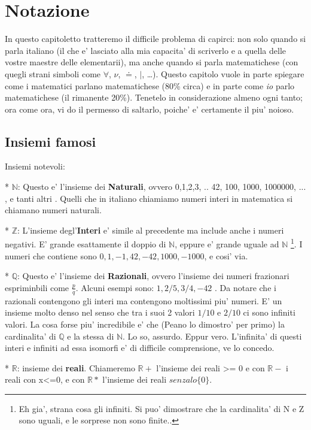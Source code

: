 \label{notazione}
\chapter{Notazione}

In questo capitoletto tratteremo il difficile problema di capirci: non solo quando si parla italiano (il che e' lasciato
alla mia capacita' di scriverlo e a quella delle vostre maestre delle elementarii), ma anche quando si parla matematichese
(con quegli strani simboli come $\forall$, $\nu$, $\doteq$, $|$, \ldots). Questo capitolo vuole in parte spiegare come i
matematici parlano matematichese (80\% circa) e in parte come {\em io} parlo matematichese (il rimanente 20\%).
Tenetelo in considerazione almeno ogni tanto; ora come ora, vi do il permesso di saltarlo, poiche' e' certamente il piu' noioso.

\section{Insiemi famosi}

Insiemi notevoli:

* $\mathbb{N}$: Questo e' l'insieme dei \textbf{Naturali}, ovvero {0,1,2,3, .. 42, 100, 1000, 1000000, ... , e tanti altri }. Quelli che in
  italiano chiamiamo numeri interi in matematica si chiamano numeri naturali.

* $\mathbb{Z}$: L'insieme degl'\textbf{Interi} e' simile al precedente ma include anche i numeri negativi. 
 E' grande esattamente il doppio di $\mathbb{N}$, eppure e' grande uguale ad $\mathbb{N}$ \footnote{Eh gia', strana cosa gli infiniti. Si puo' dimostrare che la cardinalita' di N e Z sono uguali, e le sorprese non sono finite.. }.
 I numeri che contiene sono $0,1,-1,42,-42,1000,-1000$, e cosi' via.

* $\mathbb{Q}$: Questo e' l'insieme dei \textbf{Razionali}, ovvero l'insieme dei numeri frazionari espriminbili come $\frac{p}{q}$.
Alcuni esempi sono: $1,2/5,3/4,-42$ . Da notare che i razionali contengono gli interi ma contengono moltissimi piu' numeri.
E' un insieme molto denso nel senso
che tra i suoi 2 valori $1/10$ e $2/10$ ci sono infiniti valori. La cosa forse piu' incredibile e' che (Peano lo dimostro' per primo)
la cardinalita' di $\mathbb{Q}$ e la stessa di $\mathbb{N}$. Lo so, assurdo. Eppur vero. L'infinita' di questi interi e infiniti ad essa
isomorfi e' di difficile comprensione, ve lo concedo.

* $\mathbb{R}$: insieme dei \textbf{reali}. Chiameremo $\mathbb{R}+$ l'insieme dei reali >= 0 e con $\mathbb{R}-$ i reali con x<=0, e con $\mathbb{R}*$ l'insieme dei reali $senza lo \{0\}$.

